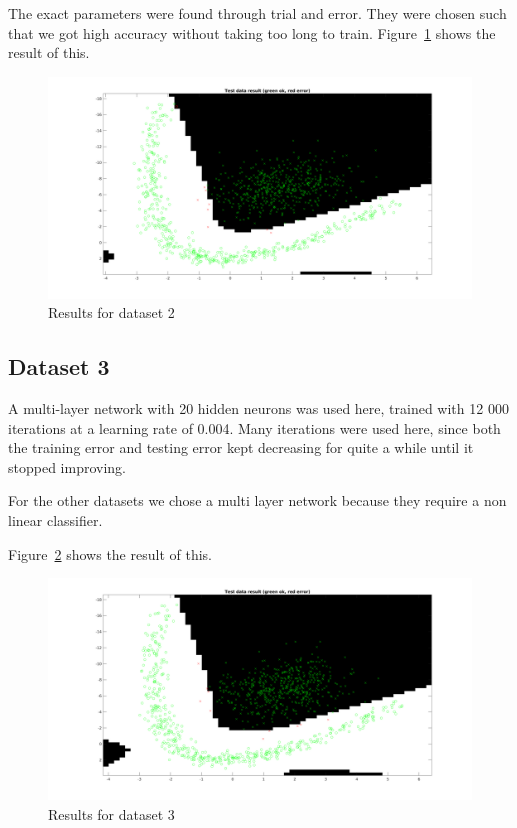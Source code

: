 \documentclass{article}
\begin{document}
The exact parameters were found through trial and error. They were chosen such
that we got high accuracy without taking too long to train.
Figure~\ref{fig:res2} shows the result of this.

\begin{figure}[h!]
    \includegraphics[width=13cm]{dataset2res.png}
    \caption{Results for dataset 2}
    \label{fig:res2}
\end{figure}

\subsection{Dataset 3}

A multi-layer network with 20 hidden neurons was used here, trained with 12 000
iterations at a learning rate of 0.004. Many iterations were used here, since
both the training error and testing error kept decreasing for quite a while
until it stopped improving.

For the other datasets we chose a multi layer network because they
require a non linear classifier.

Figure~\ref{fig:res3} shows the result of this.

\begin{figure}[h!]
    \includegraphics[width=13cm]{dataset3res.png}
    \caption{Results for dataset 3}
    \label{fig:res3}
\end{figure}
\end{document}
